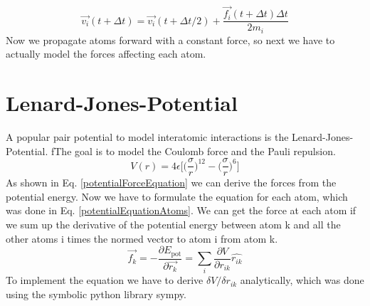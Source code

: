 \begin{equation}
	\label{verletCorrection}
	\overrightarrow{v_{i}}(t+\Delta t) = \overrightarrow{v_{i}}(t+\Delta t/2) +
	\frac{\overrightarrow{f_{i}}(t + \Delta t)\Delta t}{2m_{i}}
\end{equation}
Now we propagate atoms forward with a constant force, so next we have to actually model the forces affecting each atom.


\section{Lenard-Jones-Potential}
\begin{comment}
- pair potential
\end{comment}
A popular pair potential to model interatomic interactions is the Lenard-Jones-Potential. 
fThe goal is to model the Coulomb force and the Pauli repulsion. 
\begin{equation}
	V(r) = 4\epsilon\bigg[\Big(\frac{\sigma}{r}\Big)^{12}- \Big(\frac{\sigma}{r}\Big)^{6} \bigg]
\end{equation}
As shown in Eq. \ref{potentialForceEquation} we can derive the forces from the potential energy. Now we have to formulate the equation for each atom, which was done in Eq. \ref {potentialEquationAtoms}. We can get the force at each atom if we sum up the derivative of the potential energy between atom k and all the other atoms i times the normed vector to atom i from atom k. 
\begin{equation}
	\label{potentialEquationAtoms}
	\overrightarrow{f_{k}} = -\frac{\partial E_{\mathrm{pot}}}{\partial  \overrightarrow{r_{k}}}=\sum_{i}^{}\frac{\partial V}{\partial r_{ik}} \hat{r_{ik}}
\end{equation}
To implement the equation we have to derive $\delta V/ \delta r_{ik}$ analytically, which was done using the symbolic python library sympy. 
